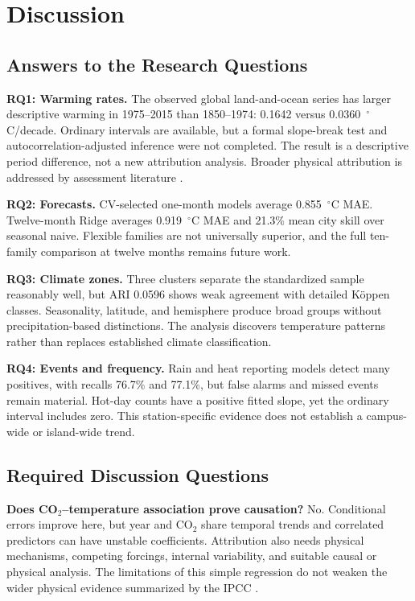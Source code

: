 \documentclass[conference]{IEEEtran}
\begin{document}
\FloatBarrier
\section{Discussion}
\subsection{Answers to the Research Questions}
\textbf{RQ1: Warming rates.} The observed global land-and-ocean series has larger descriptive warming in 1975--2015 than 1850--1974: 0.1642 versus 0.0360~$^\circ$C/decade. Ordinary intervals are available, but a formal slope-break test and autocorrelation-adjusted inference were not completed. The result is a descriptive period difference, not a new attribution analysis. Broader physical attribution is addressed by assessment literature \cite{ipcc2023}.

\textbf{RQ2: Forecasts.} CV-selected one-month models average 0.855~$^\circ$C MAE. Twelve-month Ridge averages 0.919~$^\circ$C MAE and 21.3\% mean city skill over seasonal naive. Flexible families are not universally superior, and the full ten-family comparison at twelve months remains future work.

\textbf{RQ3: Climate zones.} Three clusters separate the standardized sample reasonably well, but ARI 0.0596 shows weak agreement with detailed K\"oppen classes. Seasonality, latitude, and hemisphere produce broad groups without precipitation-based distinctions. The analysis discovers temperature patterns rather than replaces established climate classification.

\textbf{RQ4: Events and frequency.} Rain and heat reporting models detect many positives, with recalls 76.7\% and 77.1\%, but false alarms and missed events remain material. Hot-day counts have a positive fitted slope, yet the ordinary interval includes zero. This station-specific evidence does not establish a campus-wide or island-wide trend.

\subsection{Required Discussion Questions}
\textbf{Does CO$_2$--temperature association prove causation?} No. Conditional errors improve here, but year and CO$_2$ share temporal trends and correlated predictors can have unstable coefficients. Attribution also needs physical mechanisms, competing forcings, internal variability, and suitable causal or physical analysis. The limitations of this simple regression do not weaken the wider physical evidence summarized by the IPCC \cite{ipcc2023}.
\end{document}
